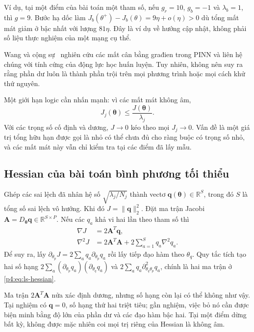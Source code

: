 Ví dụ, tại một điểm của bài toán một tham số, nếu $g_r=10$, $g_b=-1$
và $\lambda_b=1$, thì $g=9$. Bước hạ dốc làm
$J_b(\theta^+)-J_b(\theta)=9\eta+o(\eta)>0$ dù tổng mất mát giảm ở
bậc nhất với lượng $81\eta$. Đây là ví dụ về hướng cập nhật, không
phải số liệu thực nghiệm của một mạng cụ thể.

Wang và cộng sự~\cite{wang2021} nghiên cứu các mất cân bằng građien
trong PINN và liên hệ chúng với tính cứng của động lực học huấn luyện.
Tuy nhiên, không nên suy ra rằng phần dư luôn là thành phần trội trên
mọi phương trình hoặc mọi cách khử thứ nguyên.

Một giới hạn logic cần nhấn mạnh: vì các mất mát không âm,
\begin{equation}
 J_j(\boldsymbol{\theta})\leq
                \frac{J(\boldsymbol{\theta})}{\lambda_j}.
 \label{p4:eq:component-bound}
\end{equation}
Với các trọng số cố định và dương, $J\to0$ kéo theo mọi $J_j\to0$.
Vấn đề là một giá trị tổng hữu hạn được gọi là nhỏ có thể chưa đủ
cho ràng buộc có trọng số nhỏ, và các mất mát này vẫn chỉ kiểm tra
tại các điểm đã lấy mẫu.

\subsection{Hessian của bài toán bình phương tối thiểu}

Ghép các sai lệch đã nhân hệ số $\sqrt{\lambda_j/N_j}$ thành vectơ
$\mathbf{q}(\boldsymbol{\theta})\in\mathbb{R}^{S}$, trong đó $S$ là
tổng số sai lệch vô hướng. Khi đó $J=\|\mathbf{q}\|_2^2$.
Đặt ma trận Jacobi
$\mathbf{A}=D_{\boldsymbol{\theta}}\mathbf{q}\in\mathbb{R}^{S\times P}$.
Nếu các $q_a$ khả vi hai lần theo tham số thì
\begin{align}
 \nabla J&=2\mathbf{A}^{T}\mathbf{q},\label{p4:eq:ls-gradient}\\
 \nabla^2J&=2\mathbf{A}^{T}\mathbf{A}
          +2\sum_{a=1}^{S}q_a\nabla^2q_a.
          \label{p4:eq:ls-hessian}
\end{align}
Để suy ra, lấy $\partial_{\theta_p}J=2\sum_aq_a\partial_{\theta_p}q_a$
rồi lấy tiếp đạo hàm theo $\theta_q$. Quy tắc tích tạo hai số hạng
$2\sum_a(\partial_{\theta_p}q_a)(\partial_{\theta_q}q_a)$ và
$2\sum_aq_a\partial^2_{\theta_q\theta_p}q_a$, chính là hai ma trận
ở \eqref{p4:eq:ls-hessian}.

Ma trận $2\mathbf{A}^{T}\mathbf{A}$ nửa xác định dương, nhưng số hạng
còn lại có thể không như vậy. Tại nghiệm có $\mathbf{q}=0$, số hạng
thứ hai triệt tiêu; gần nghiệm, việc bỏ nó cần được biện minh bằng
độ lớn của phần dư và các đạo hàm bậc hai. Tại một điểm dừng bất kỳ,
không được mặc nhiên coi mọi trị riêng của Hessian là không âm.

